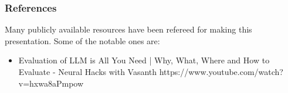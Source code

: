 \begin{frame}\frametitle{References}
Many publicly available resources have been refereed for making this presentation. Some of the notable ones are:
\footnotesize
\begin{itemize}
\item Evaluation of LLM is All You Need | Why, What, Where and How to Evaluate - Neural Hacks with Vasanth https://www.youtube.com/watch?v=hxwa8aPmpow
\end{itemize}

\end{frame}